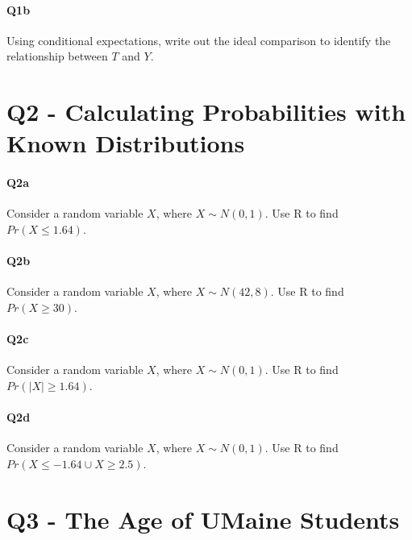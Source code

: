 \documentclass[12pt]{article}		%
\begin{document}
\vspace{2cm}

\paragraph*{Q1b}
Using conditional expectations, write out the ideal comparison to identify the relationship between $T$ and $Y$.


\clearpage

\section*{Q2 - Calculating Probabilities with Known Distributions}

\paragraph*{Q2a}

Consider a random variable $X$, where $X \sim N(0,1)$. Use R to find $Pr(X \leq 1.64)$.

\vspace{2cm}

\paragraph*{Q2b}

Consider a random variable $X$, where $X \sim N(42,8)$. Use R to find $Pr(X \geq 30)$.

\vspace{2cm}

\paragraph*{Q2c}
Consider a random variable $X$, where $X \sim N(0,1)$. Use R to find $Pr(|X| \geq 1.64)$.

\vspace{2cm}

\paragraph*{Q2d}
Consider a random variable $X$, where $X \sim N(0,1)$. Use R to find $Pr(X \leq -1.64 \cup X \geq 2.5)$.

\vspace{2cm}

\clearpage


\section*{Q3 - The Age of UMaine Students}
\end{document}

